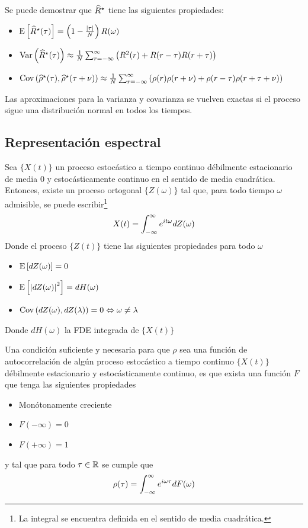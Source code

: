 Se puede demostrar que $\widehat{ R }^{\star}$ tiene las siguientes propiedades:
\begin{itemize}
\item $\mathrm{E}\left[ \widehat{ R }^{\star}(\tau) \right] = \left(1 - \frac{\left| \tau \right|}{N} \right) R(\omega)$
\item $\mathrm{Var}\left( \widehat{ R }^{\star}(\tau) \right) \approx \frac{1}{N} 
\sum_{r=-\infty}^{\infty} \left( R^{2}(r) + R(r-\tau)R(r+\tau) \right)$
\item $\mathrm{Cov}\left( \widehat{ \rho }^{\star}(\tau),\widehat{ \rho }^{\star}(\tau+\nu) \right) \approx \frac{1}{N} 
\sum_{r=-\infty}^{\infty} \left( \rho(r)\rho(r+\nu) + \rho(r-\tau)\rho(r+\tau+\nu) \right)$
\end{itemize}
Las aproximaciones para la varianza y covarianza se vuelven exactas si el proceso sigue una 
distribución normal en todos los tiempos.


\subsection{Representación espectral}

\begin{teorema}
Sea $\{X(t)\}$ un proceso estocástico a tiempo continuo débilmente estacionario de media 0 y 
estocásticamente continuo en el sentido de media cuadrática. Entonces, existe un proceso 
ortogonal $\{Z(\omega)\}$ tal que, para todo tiempo $\omega$ admisible, se puede 
escribir\footnote{La integral se encuentra definida en el sentido de media cuadrática.}
\begin{equation*}
X(t) = \int_{-\infty}^{\infty} e^{i t \omega} dZ(\omega)
\end{equation*}
Donde el proceso $\{Z(t)\}$ tiene las siguientes propiedades para todo $\omega$
\begin{itemize}
\item $\mathrm{E}\left[ dZ(\omega) \right] = 0$
\item $\mathrm{E}\left[ \left| dZ(\omega) \right|^{2} \right] = dH(\omega)$
\item $\mathrm{Cov}\left( dZ(\omega),dZ(\lambda) \right) = 0 \Leftrightarrow \omega \neq \lambda$
\end{itemize}
Donde $dH(\omega)$ la FDE integrada de $\{X(t)\}$
\end{teorema}

\begin{teorema}
Una condición suficiente y necesaria para que $\rho$ sea una función de autocorrelación de 
algún proceso estocástico a tiempo continuo $\{X(t)\}$ débilmente estacionario y 
estocásticamente continuo, es que exista una función $F$ que tenga las siguientes propiedades
\begin{itemize}
\item Monótonamente creciente
\item $F(-\infty) = 0$
\item $F(+\infty) = 1$
\end{itemize}
y tal que para todo $\tau \in \mathbb{R}$ se cumple que
\begin{equation*}
\rho(\tau) = \int_{-\infty}^{\infty} e^{i \omega \tau} dF(\omega)
\end{equation*}
\label{t_wienerkhinchin}
\end{teorema}

